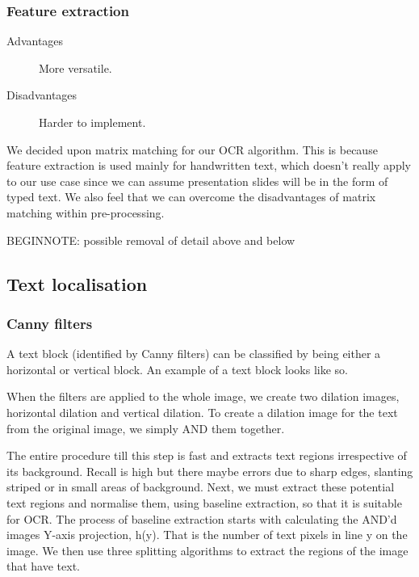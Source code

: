 \documentclass[a4paper,12pt]{article}
\begin{document}
\subsubsection{Feature extraction}
\begin{description}
\item[Advantages] More versatile.
\item[Disadvantages] Harder to implement.
\end{description}

We decided upon matrix matching for our OCR algorithm. This is because feature extraction is used mainly for handwritten text, which doesn’t really apply to our use case since we can assume presentation slides will be in the form of typed text. We also feel that we can overcome the disadvantages of matrix matching within pre-processing.

BEGINNOTE: possible removal of detail above and below

\subsection{Text localisation}
\subsubsection{Canny filters}

A text block (identified by Canny filters) can be classified by being either a horizontal or vertical block. An example of a text block looks like so.

When the filters are applied to the whole image, we create two dilation images, horizontal dilation and vertical dilation. To create a dilation image for the text from the original image, we simply AND them together.

The entire procedure till this step is fast and extracts text regions irrespective of its background. Recall is high but there maybe errors due to sharp edges, slanting striped or in small areas of background. Next, we must extract these potential text regions and normalise them, using baseline extraction, so that it is suitable for OCR. The process of baseline extraction starts with calculating the AND’d images Y-axis projection, h(y). That is the number of text pixels in line y on the image. We then use three splitting algorithms to extract the regions of the image that have text.
\end{document}
